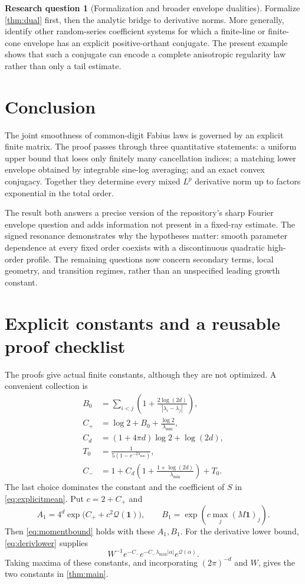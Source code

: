 \documentclass[11pt,a4paper]{article}
\numberwithin{equation}{section}
\theoremstyle{definition}
\newtheorem{question}{Research question}
\theoremstyle{remark}\newtheorem{remark}[theorem]{Remark}
\newcommand{\one}{\mathbf 1}
\newcommand{\Qf}{\mathcal Q}
\begin{document}
\begin{question}[Formalization and broader envelope dualities]
Formalize \cref{thm:dual} first, then the analytic bridge to derivative norms.
More generally, identify other random-series coefficient systems for which
a finite-line or finite-cone envelope has an explicit positive-orthant
conjugate. The present example shows that such a conjugate can encode a
complete anisotropic regularity law rather than only a tail estimate.
\end{question}

\section{Conclusion}

The joint smoothness of common-digit Fabius laws is governed by an explicit
finite matrix. The proof passes through three quantitative statements:
a uniform upper bound that loses only finitely many cancellation indices;
a matching lower envelope obtained by integrable sine-log averaging;
and an exact convex conjugacy. Together they determine every mixed
$L^p$ derivative norm up to factors exponential in the total order.

The result both answers a precise version of the repository's sharp Fourier
envelope question and adds information not present in a fixed-ray estimate.
The signed resonance demonstrates why the hypotheses matter: smooth
parameter dependence at every fixed order coexists with a discontinuous
quadratic high-order profile. The remaining questions now concern secondary
terms, local geometry, and transition regimes, rather than an unspecified
leading growth constant.

\appendix
\section{Explicit constants and a reusable proof checklist}
\label{app:constants}

The proofs give actual finite constants, although they are not optimized.
A convenient collection is
\begin{align}
 B_0&=\sum_{i<j}\left(1+\frac{2\log(2d)}{|\lambda_i-\lambda_j|}\right),\\
 C_+&=\log2+B_0+\frac{\log2}{\lambda_{\min}},\\
 C_d&=(1+4\pi d)\log2+\log(2d),\\
 T_0&=\frac1{5(1-e^{-2\lambda_{\min}})},\\
 C_-&=1+C_d\left(1+\frac{1+\log(2d)}{\lambda_{\min}}\right)+T_0.
\end{align}
The last choice dominates the constant and the coefficient of $S$ in
\eqref{eq:explicitmean}. Put $c=2+C_+$ and
\begin{equation}
 A_1=4^d\exp\bigl(C_++c^2\Qf(\one)\bigr),\qquad
 B_1=\exp\left(c\max_j(M\one)_j\right).
\end{equation}
Then \eqref{eq:momentbound} holds with these $A_1,B_1$. For the derivative
lower bound, \eqref{eq:derivlower} supplies
\[
 W^{-1}e^{-C_-}e^{-C_-\lambda_{\max}|\alpha|}e^{\Qf(\alpha)}.
\]
Taking maxima of these constants, and incorporating $(2\pi)^{-d}$ and $W$,
gives the two constants in \cref{thm:main}.
\end{document}
